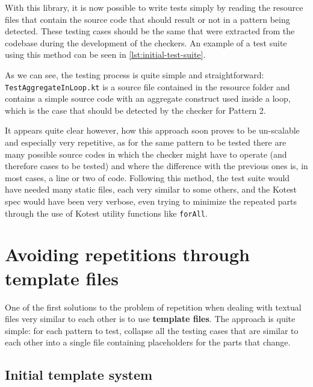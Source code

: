 \documentclass[12pt,a4paper,openright,twoside]{book}
\begin{document}
With this library, it is now possible to write tests simply by reading the
resource files that contain the source code that should result or not in a
pattern being detected. These testing cases should be the same that were
extracted from the codebase during the development of the checkers. An example
of a test suite using this method can be seen in \cref{lst:initial-test-suite}.
%

%
As we can see, the testing process is quite simple and straightforward:
\lstinline{TestAggregateInLoop.kt} is a source file contained in the resource
folder and contains a simple source code with an aggregate construct used inside
a loop, which is the case that should be detected by the checker for Pattern 2.

It appears quite clear however, how this approach soon proves to be un-scalable
and especially very repetitive, as for the same pattern to be tested there are
many possible source codes in which the checker might have to operate (and
therefore cases to be tested) and where the difference with the previous ones
is, in most cases, a line or two of code. 
%
Following this method, the test suite would have needed many static files, each
very similar to some others, and the Kotest spec would have been very verbose,
even trying to minimize the repeated parts through the use of Kotest utility
functions like \lstinline{forAll}.

\section{Avoiding repetitions through template files}

One of the first solutions to the problem of repetition when dealing with
textual files very similar to each other is to use \textbf{template files}. The
approach is quite simple: for each pattern to test, collapse all the testing
cases that are similar to each other into a single file containing placeholders
for the parts that change. 

\subsection{Initial template system}

\end{document}
